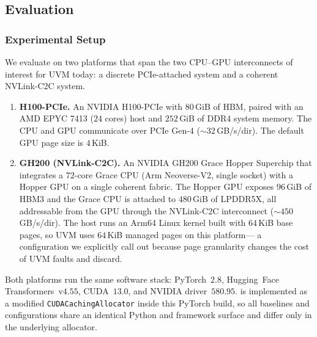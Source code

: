 \subsection{Evaluation}
\label{uvm:sec:eval}


\subsubsection{Experimental Setup}
\label{uvm:sec:eval:setup}

We evaluate {\uvmname} on two platforms that span the
    two CPU--GPU interconnects of interest for UVM today:
    a discrete PCIe-attached system and a coherent NVLink-C2C system.
\begin{enumerate}
\item \textbf{H100-PCIe.}
    An NVIDIA H100-PCIe with $80$\,GiB of HBM,
    paired with an AMD EPYC 7413 ($24$ cores) host
    and $252$\,GiB of DDR4 system memory.
    The CPU and GPU communicate over PCIe Gen-4 ($\sim$$32$\,GB/s/dir).
    The default GPU page size is $4$\,KiB.
\item \textbf{GH200 (NVLink-C2C).}
    An NVIDIA GH200 Grace Hopper Superchip
    that integrates a $72$-core Grace CPU (Arm Neoverse-V2, single socket)
    with a Hopper GPU on a single coherent fabric.
    The Hopper GPU exposes $96$\,GiB of HBM3
    and the Grace CPU is attached to $480$\,GiB of LPDDR5X,
    all addressable from the GPU through the NVLink-C2C interconnect
    ($\sim$$450$\,GB/s/dir).
    The host runs an Arm64 Linux kernel built with $64$\,KiB base pages,
    so UVM uses $64$\,KiB managed pages on this platform---%
    a configuration we explicitly call out
    because page granularity changes the cost of UVM faults and discard.
\end{enumerate}

Both platforms run the same software stack:
    PyTorch~$2.8$,
    Hugging~Face Transformers~v$4.55$,
    CUDA~$13.0$,
    and NVIDIA driver~$580.95$.
{\uvmname} is implemented as a modified \texttt{CUDACachingAllocator}
    inside this PyTorch build,
    so all baselines and {\uvmname} configurations
    share an identical Python and framework surface
    and differ only in the underlying allocator.

